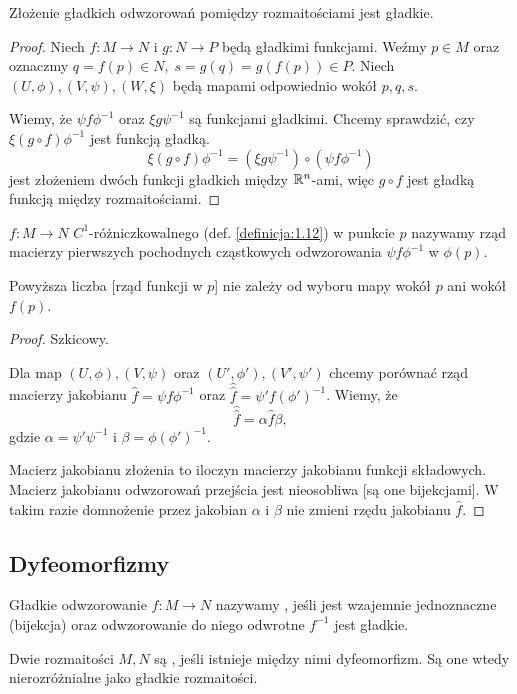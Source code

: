 \begin{fact}
  Złożenie gładkich odwzorowań pomiędzy rozmaitościami jest gładkie.
\end{fact}

\begin{proof}
  Niech $f:M\to N$ i $g:N\to P$ będą gładkimi funkcjami. Weźmy $p\in M$ oraz oznaczmy $q=f(p)\in N,\;s=g(q)=g(f(p))\in P$. Niech $(U,\phi),(V,\psi),(W,\xi)$ będą mapami odpowiednio wokół $p,q,s$.

  Wiemy, że $\psi f\phi^{-1}$ oraz $\xi g\psi^{-1}$ są funkcjami gładkimi. Chcemy sprawdzić, czy $\xi (g\circ f)\phi^{-1}$ jest funkcją gładką.
  $$\xi(g\circ f)\phi^{-1}=(\xi g\psi^{-1})\circ (\psi f\phi^{-1})$$
  jest złożeniem dwóch funkcji gładkich między $\mathbb{R}^n$-ami, więc $g\circ f$ jest gładką funkcją między rozmaitościami.
\end{proof}

\begin{definition}  $f:M\to N$ $C^1$-różniczkowalnego (def. \ref{definicja:1.12}) w punkcie $p$ nazywamy rząd macierzy pierwszych pochodnych cząstkowych odwzorowania $\psi f\phi^{-1}$ w $\phi(p)$.
\end{definition}

\begin{fact} Powyższa liczba [rząd funkcji w $p$] nie zależy od wyboru mapy wokół $p$ ani wokół $f(p)$.
\end{fact}

\begin{proof}
  Szkicowy.

  Dla map $(U,\phi),(V,\psi)$ oraz $(U',\phi'),(V',\psi')$ chcemy porównać rząd macierzy jakobianu $\hat{f}=\psi f\phi^{-1}$ oraz $\hat{\hat{f}}=\psi'f(\phi')^{-1}$. Wiemy, że
  $$\hat{\hat{f}}=\alpha \hat{f}\beta,$$
  gdzie $\alpha=\psi'\psi^{-1}$ i $\beta=\phi(\phi')^{-1}$.

  Macierz jakobianu złożenia to iloczyn macierzy jakobianu funkcji składowych. Macierz jakobianu odwzorowań przejścia jest nieosobliwa [są one bijekcjami]. W takim razie domnożenie przez jakobian $\alpha$ i $\beta$ nie zmieni rzędu jakobianu $\hat{f}$.
\end{proof}

\subsection{Dyfeomorfizmy}

\begin{definition}[dyfeomorfizm]\label{definicja:dyfeomorfizmy} Gładkie odwzorowanie $f:M\to N$ nazywamy , jeśli jest wzajemnie jednoznaczne (bijekcja) oraz odwzorowanie do niego odwrotne $f^{-1}$ jest gładkie.

  Dwie rozmaitości $M, N$ są , jeśli istnieje między nimi dyfeomorfizm. Są one wtedy nierozróżnialne jako gładkie rozmaitości.
\end{definition}

